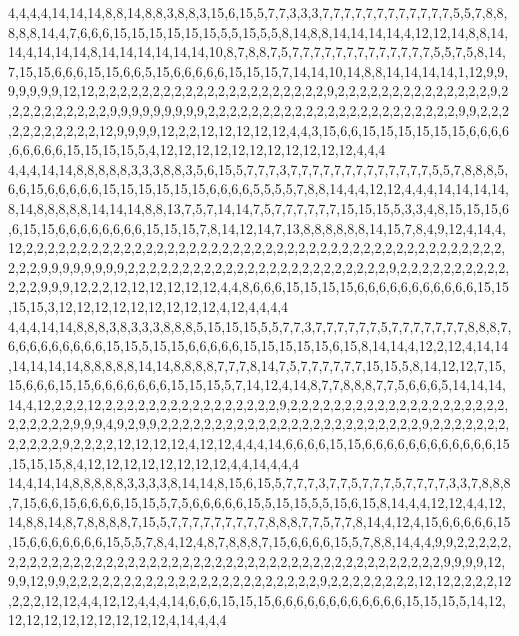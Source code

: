 4,4,4,4,14,14,14,8,8,14,8,8,3,8,8,3,15,6,15,5,7,7,3,3,3,7,7,7,7,7,7,7,7,7,7,7,7,5,5,7,8,8,8,8,8,14,4,7,6,6,6,15,15,15,15,15,15,5,5,15,5,5,8,14,8,8,14,14,14,14,4,12,12,14,8,8,14,14,4,14,14,14,8,14,14,14,14,14,14,10,8,7,8,8,7,5,7,7,7,7,7,7,7,7,7,7,7,7,7,5,5,7,5,8,14,7,15,15,6,6,6,15,15,6,6,5,15,6,6,6,6,6,15,15,15,7,14,14,10,14,8,8,14,14,14,14,1,12,9,9,9,9,9,9,9,12,12,2,2,2,2,2,2,2,2,2,2,2,2,2,2,2,2,2,2,2,2,2,9,2,2,2,2,2,2,2,2,2,2,2,2,2,2,9,2,2,2,2,2,2,2,2,2,2,9,9,9,9,9,9,9,9,9,2,2,2,2,2,2,2,2,2,2,2,2,2,2,2,2,2,2,2,2,2,2,2,9,9,2,2,2,2,2,2,2,2,2,2,2,12,9,9,9,9,12,2,2,12,12,12,12,12,4,4,3,15,6,6,15,15,15,15,15,15,6,6,6,6,6,6,6,6,6,15,15,15,15,5,4,12,12,12,12,12,12,12,12,12,12,12,4,4,4
4,4,4,14,14,8,8,8,8,8,3,3,3,8,8,3,5,6,15,5,7,7,7,3,7,7,7,7,7,7,7,7,7,7,7,7,7,5,5,7,8,8,8,5,6,6,15,6,6,6,6,6,15,15,15,15,15,15,6,6,6,6,5,5,5,5,7,8,8,14,4,4,12,12,4,4,4,14,14,14,14,8,14,8,8,8,8,8,14,14,14,8,8,13,7,5,7,14,14,7,5,7,7,7,7,7,7,15,15,15,5,3,3,4,8,15,15,15,6,6,15,15,6,6,6,6,6,6,6,6,15,15,15,7,8,14,12,14,7,13,8,8,8,8,8,8,14,15,7,8,4,9,12,4,14,4,12,2,2,2,2,2,2,2,2,2,2,2,2,2,2,2,2,2,2,2,2,2,2,2,2,2,2,2,2,2,2,2,2,2,2,2,2,2,2,2,2,2,2,2,2,2,2,2,9,9,9,9,9,9,9,9,2,2,2,2,2,2,2,2,2,2,2,2,2,2,2,2,2,2,2,2,2,2,2,2,9,2,2,2,2,2,2,2,2,2,2,2,2,2,9,9,9,12,2,2,12,12,12,12,12,12,4,4,8,6,6,6,15,15,15,15,6,6,6,6,6,6,6,6,6,6,6,15,15,15,15,3,12,12,12,12,12,12,12,12,12,4,12,4,4,4,4
4,4,4,14,14,8,8,8,3,8,3,3,3,8,8,8,5,15,15,15,5,5,7,7,3,7,7,7,7,7,7,5,7,7,7,7,7,7,7,8,8,8,7,6,6,6,6,6,6,6,6,6,15,15,5,15,15,6,6,6,6,6,15,15,15,15,15,6,15,8,14,14,4,12,2,12,4,14,14,14,14,14,14,8,8,8,8,8,14,14,8,8,8,8,7,7,7,8,14,7,5,7,7,7,7,7,7,15,15,5,8,14,12,12,7,15,15,6,6,6,15,15,6,6,6,6,6,6,6,15,15,15,5,7,14,12,4,14,8,7,7,8,8,8,7,7,5,6,6,6,5,14,14,14,14,4,12,2,2,2,12,2,2,2,2,2,2,2,2,2,2,2,2,2,2,2,2,9,2,2,2,2,2,2,2,2,2,2,2,2,2,2,2,2,2,2,2,2,2,2,2,2,2,2,9,9,9,4,9,2,9,9,2,2,2,2,2,2,2,2,2,2,2,2,2,2,2,2,2,2,2,2,2,2,2,2,9,2,2,2,2,2,2,2,2,2,2,2,2,9,2,2,2,2,12,12,12,12,4,12,12,4,4,4,14,6,6,6,6,15,15,6,6,6,6,6,6,6,6,6,6,6,6,15,15,15,15,8,4,12,12,12,12,12,12,12,12,4,4,14,4,4,4
14,4,14,14,8,8,8,8,8,3,3,3,3,8,14,14,8,15,6,15,5,7,7,7,3,7,7,5,7,7,7,5,7,7,7,7,3,3,7,8,8,8,7,15,6,6,15,6,6,6,6,15,15,5,7,5,6,6,6,6,6,15,5,15,15,5,5,15,6,15,8,14,4,4,12,12,4,4,12,14,8,8,14,8,7,8,8,8,8,7,15,5,7,7,7,7,7,7,7,7,7,8,8,8,7,7,5,7,7,8,14,4,12,4,15,6,6,6,6,6,15,15,6,6,6,6,6,6,6,15,5,5,7,8,4,12,4,8,7,8,8,8,7,15,6,6,6,6,15,5,7,8,8,14,4,4,9,9,2,2,2,2,2,2,2,2,2,2,2,2,2,2,2,2,2,2,2,2,2,2,2,2,2,2,2,2,2,2,2,2,2,2,2,2,2,2,2,2,2,2,2,2,2,9,9,9,9,12,9,9,12,9,9,2,2,2,2,2,2,2,2,2,2,2,2,2,2,2,2,2,2,2,2,2,2,2,9,2,2,2,2,2,2,2,2,12,12,2,2,2,2,12,2,2,2,12,12,4,4,12,12,4,4,4,14,6,6,6,15,15,15,6,6,6,6,6,6,6,6,6,6,6,6,15,15,15,5,14,12,12,12,12,12,12,12,12,12,12,4,14,4,4,4
